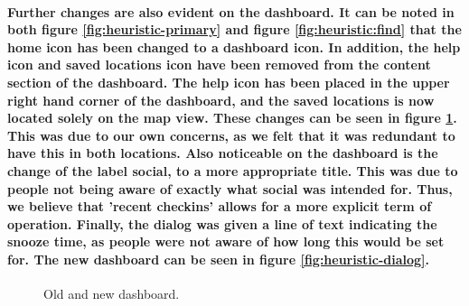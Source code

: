 \documentclass{report}
\begin{document}
    \paragraph{Further changes are also evident on the dashboard. It can be
    noted in both figure \ref{fig:heuristic-primary} and figure 
    \ref{fig:heuristic:find} that the home icon has been changed
    to a dashboard icon. In addition, the help icon and saved locations icon have
    been removed from the content section of the dashboard. The help icon has been
    placed in the upper right hand corner of the dashboard, and the saved locations
    is now located solely on the map view. These changes can be seen in figure
    \ref{fig:heuristic-dashboard}. This was due to our own concerns, as we felt that it was redundant to
    have this in both locations. Also noticeable on the dashboard is the change of
    the label social, to a more appropriate title. This was due to people not being
    aware of exactly what social was intended for. Thus, we believe that 'recent
    checkins' allows for a more explicit term of operation. Finally, the dialog was
    given a line of text indicating the snooze time, as people were not aware of how
    long this would be set for. The new dashboard can be seen in figure
    \ref{fig:heuristic-dialog}.}
    \begin{figure}
    \centering
    \caption{Old and new dashboard.}
    \label{fig:heuristic-dashboard}
    \end{figure}
\end{document}
